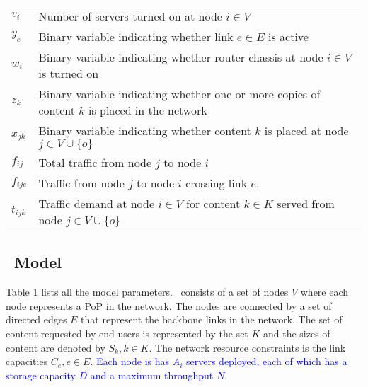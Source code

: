 \begin{table*}[t]
\begin{small}
\begin{tabular}{|p{6.15in}|}
\end{tabular}
\begin{tabular}{|p{1in}|p{5in}|}
\hline
$v_i$ & Number of servers turned on at  node $i \in V$\\
$y_e$ & Binary variable indicating whether link $e \in E$ is active \\
$w_i$ & Binary variable indicating whether router chassis at node $i \in V$ is turned on \\
$z_k$ & Binary variable indicating whether one or more copies of content $k$ is placed in the network\\
$x_{jk}$ & Binary variable indicating whether content $k$  is placed at node $j \in V \cup \{o\}$\\

$f_{ij}$ & Total traffic from node $j$ to node $i$\\
$f_{ije}$ & Traffic from node $j$ to node $i$ crossing link $e$.\\
$t_{ijk}$ & Traffic demand at node $i \in V$ for content $k\in K$ served from node $j \in V \cup \{o\}$ \\\hline
\end{tabular}
\end{small}
\label{table:paramtable}
\caption{List of input  and decision variables for the \ncp\ problem formulation.}
\vspace{-0.2in}
\end{table*}

\subsection{\ncp\ Model}
\label{sec:model}



Table 1 lists all the model parameters. \Ancp\ consists of a set of nodes $V$ where each node represents a PoP in the network. The nodes are connected by a set of directed edges $E$ that represent the backbone links in the network. The set of content requested by end-users is represented by the set $K$ and the sizes of content are denoted by $S_k, k\in K$.  The network resource constraints is the link capacities $C_e, e\in E$.  \textcolor{blue}{Each node is has $A_i$ servers deployed, each of which has a storage capacity $D$ and a maximum throughput $N$. }




